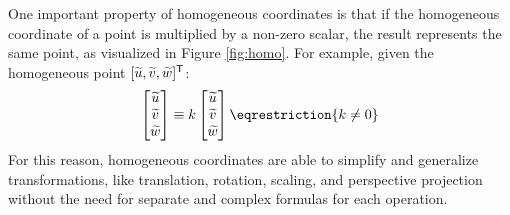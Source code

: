 One important property of homogeneous coordinates is that if the homogeneous coordinate of a point is multiplied by a non-zero scalar, the result represents the same point, as visualized in Figure \ref{fig:homo}. For example, given the homogeneous point $[\widetilde{u},\widetilde{v},\widetilde{w}]^{\mathsf{T}}$:
\begin{equation}
    \begin{bmatrix}
        \widetilde{u} \\ \widetilde{v} \\ \widetilde{w}
    \end{bmatrix}
    \equiv
    k
    \begin{bmatrix}
        \widetilde{u} \\ \widetilde{v} \\ \widetilde{w}
    \end{bmatrix}
    \eqrestriction{k \neq 0}
\end{equation}
For this reason, homogeneous coordinates are able to simplify and generalize transformations, like translation, rotation, scaling, and perspective projection without the need for separate and complex formulas for each operation.






